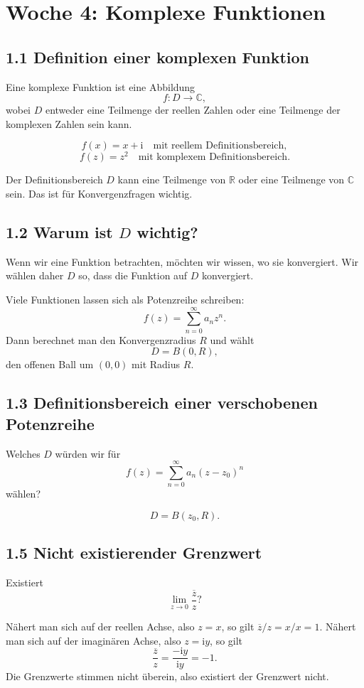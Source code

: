 \documentclass[11pt,a4paper]{article}
\newcommand{\C}{\mathbb C}
\newcommand{\R}{\mathbb R}
\newcommand{\ii}{\mathrm i}
\begin{document}
\section{Woche 4: Komplexe Funktionen}

\subsection{1.1 Definition einer komplexen Funktion}
Eine komplexe Funktion ist eine Abbildung
\[
f:D\to\C,
\]
wobei $D$ entweder eine Teilmenge der reellen Zahlen oder eine Teilmenge der komplexen Zahlen sein kann.

\begin{beispielbox}
\[
f(x)=x+\ii \quad\text{mit reellem Definitionsbereich},
\]
\[
f(z)=z^2 \quad\text{mit komplexem Definitionsbereich}.
\]
\end{beispielbox}

\begin{importantbox}
Der Definitionsbereich $D$ kann eine Teilmenge von $\R$ oder eine Teilmenge von $\C$ sein. Das ist für Konvergenzfragen wichtig.
\end{importantbox}

\subsection{1.2 Warum ist $D$ wichtig?}
Wenn wir eine Funktion betrachten, möchten wir wissen, wo sie konvergiert. Wir wählen daher $D$ so, dass die Funktion auf $D$ konvergiert.

Viele Funktionen lassen sich als Potenzreihe schreiben:
\[
f(z)=\sum_{n=0}^{\infty}a_nz^n.
\]
Dann berechnet man den Konvergenzradius $R$ und wählt
\[
D=B(0,R),
\]
den offenen Ball um $(0,0)$ mit Radius $R$.

\subsection{1.3 Definitionsbereich einer verschobenen Potenzreihe}
\begin{fragebox}
Welches $D$ würden wir für
\[
f(z)=\sum_{n=0}^{\infty}a_n(z-z_0)^n
\]
wählen?
\end{fragebox}
\begin{antwortbox}
\[
D=B(z_0,R).
\]
\end{antwortbox}

\subsection{1.5 Nicht existierender Grenzwert}
\begin{fragebox}
Existiert
\[
\lim_{z\to0}\frac{\overline z}{z}?
\]
\end{fragebox}
\begin{antwortbox}
Nähert man sich auf der reellen Achse, also $z=x$, so gilt $\overline z/z=x/x=1$. Nähert man sich auf der imaginären Achse, also $z=\ii y$, so gilt
\[
\frac{\overline z}{z}=\frac{-\ii y}{\ii y}=-1.
\]
Die Grenzwerte stimmen nicht überein, also existiert der Grenzwert nicht.
\end{antwortbox}
\end{document}
